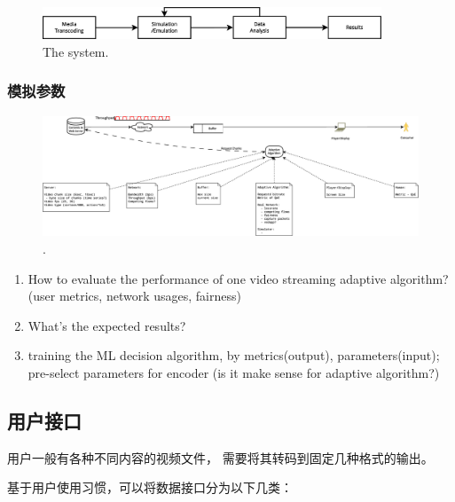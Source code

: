 \begin{figure}\centering
  \includegraphics[width=0.9\textwidth]{figures-appconv2dash/flowchart-0-system.eps}
  \caption{The system.}\label{fig:system}
\end{figure}



\subsubsection{模拟参数}

\begin{figure}\centering
  \includegraphics[width=1.1\textwidth]{figures-appconv2dash/dash-parameters.eps}
  \caption{.}\label{fig:dashalgoparam}
\end{figure}



\begin{enumerate}
  \item How to evaluate the performance of one video streaming adaptive algorithm? (user metrics, network usages, fairness)
  \item What's the expected results?
  \item training the ML decision algorithm, by metrics(output), parameters(input);
  pre-select parameters for encoder (is it make sense for adaptive algorithm?)
\end{enumerate}




\subsection{用户接口}

用户一般有各种不同内容的视频文件，
需要将其转码到固定几种格式的输出。

基于用户使用习惯，可以将数据接口分为以下几类：

